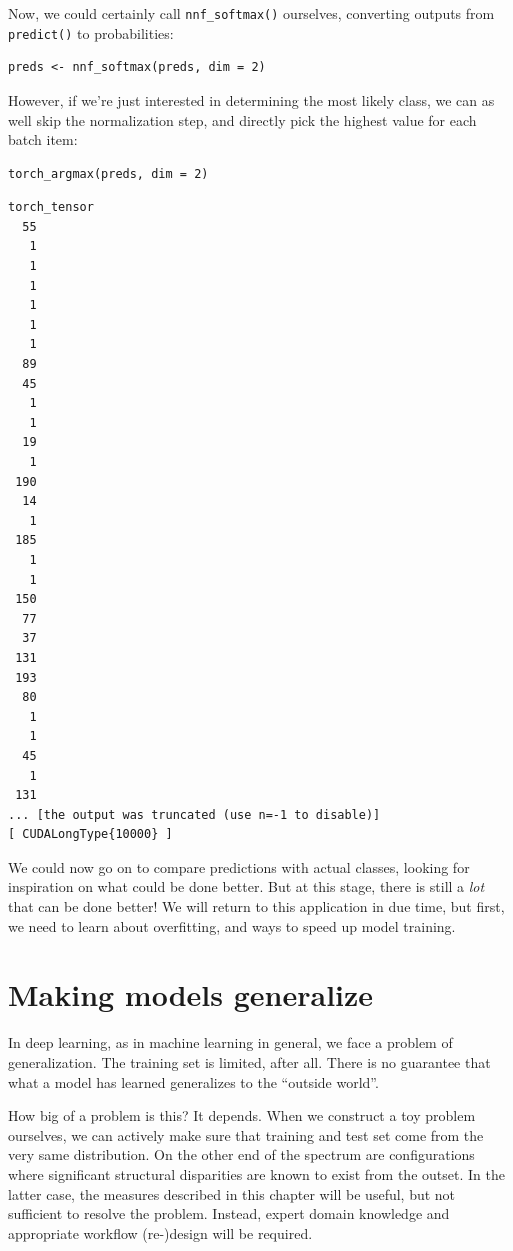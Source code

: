 \documentclass[
  letterpaper,
]{krantz}
\begin{document}
Now, we could certainly call \texttt{nnf\_softmax()} ourselves,
converting outputs from \texttt{predict()} to probabilities:

\begin{verbatim}
preds <- nnf_softmax(preds, dim = 2)
\end{verbatim}

However, if we're just interested in determining the most likely class,
we can as well skip the normalization step, and directly pick the
highest value for each batch item:

\begin{verbatim}
torch_argmax(preds, dim = 2)
\end{verbatim}

\begin{verbatim}
torch_tensor
  55
   1
   1
   1
   1
   1
   1
  89
  45
   1
   1
  19
   1
 190
  14
   1
 185
   1
   1
 150
  77
  37
 131
 193
  80
   1
   1
  45
   1
 131
... [the output was truncated (use n=-1 to disable)]
[ CUDALongType{10000} ]
\end{verbatim}

We could now go on to compare predictions with actual classes, looking
for inspiration on what could be done better. But at this stage, there
is still a \emph{lot} that can be done better! We will return to this
application in due time, but first, we need to learn about overfitting,
and ways to speed up model training.

\hypertarget{sec:overfitting}{%
\chapter{Making models generalize}\label{sec:overfitting}}

In deep learning, as in machine learning in general, we face a problem
of generalization. The training set is limited, after all. There is no
guarantee that what a model has learned generalizes to the ``outside
world''.

How big of a problem is this? It depends. When we construct a toy
problem ourselves, we can actively make sure that training and test set
come from the very same distribution. On the other end of the spectrum
are configurations where significant structural disparities are known to
exist from the outset. In the latter case, the measures described in
this chapter will be useful, but not sufficient to resolve the problem.
Instead, expert domain knowledge and appropriate workflow (re-)design
will be required.
\end{document}
